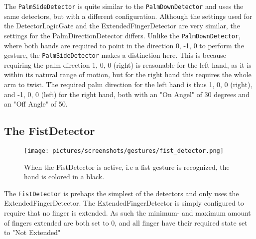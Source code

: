 The \texttt{PalmSideDetector} is quite similar to the \texttt{PalmDownDetector} and uses the same detectors, but with a different configuration. 
Although the settings used for the DetectorLogicGate and the ExtendedFingerDetector are very similar, the settings for the PalmDirectionDetector differs.
Unlike the \texttt{PalmDownDetector}, where both hands are required to point in the direction {0, -1, 0} to perform the gesture, the \texttt{PalmSideDetector} makes 
a distinction here. This is because requiring the palm direction {1, 0, 0} (right) is reasonable for the left hand, as it is within its natural range of motion, but
for the right hand this requires the whole arm to twist. The required palm direction for the left hand is thus {1, 0, 0} (right), and {-1, 0, 0} (left) for the right hand, both
with an "On Angel" of 30 degrees and an "Off Angle" of 50.

\subsection{The FistDetector}
\begin{figure}%
	\texttt{[image: pictures/screenshots/gestures/fist\_detector.png]}
	\caption[The fist gesture]{When the FistDetector is active, i.e a fist gesture is recognized, the hand is colored in a black.}
	\label{fig:fist_detector}
\end{figure} 
The \texttt{FistDetector} is prehaps the simplest of the detectors and only uses the ExtendedFingerDetector.
The ExtendedFingerDetector is simply configured to require that no finger is extended. 
As such the minimum- and maximum amount of fingers extended are both set to 0, and all finger have their required state set to "Not Extended"

